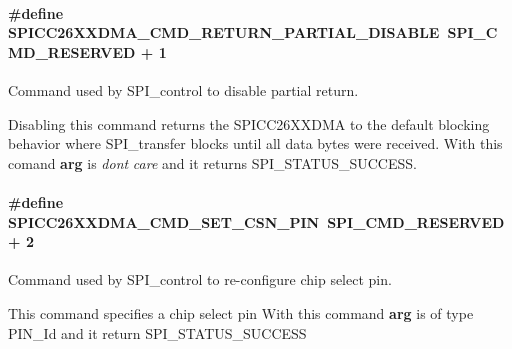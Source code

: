 \paragraph[{S\+P\+I\+C\+C26\+X\+X\+D\+M\+A\+\_\+\+C\+M\+D\+\_\+\+R\+E\+T\+U\+R\+N\+\_\+\+P\+A\+R\+T\+I\+A\+L\+\_\+\+D\+I\+S\+A\+B\+L\+E}]{\setlength{\rightskip}{0pt plus 5cm}\#define S\+P\+I\+C\+C26\+X\+X\+D\+M\+A\+\_\+\+C\+M\+D\+\_\+\+R\+E\+T\+U\+R\+N\+\_\+\+P\+A\+R\+T\+I\+A\+L\+\_\+\+D\+I\+S\+A\+B\+L\+E~{\bf S\+P\+I\+\_\+\+C\+M\+D\+\_\+\+R\+E\+S\+E\+R\+V\+E\+D} + 1}\label{group___s_p_i___c_m_d_gaff8de4036abcdb2903cb5280120c30b4}


Command used by S\+P\+I\+\_\+control to disable partial return. 

Disabling this command returns the S\+P\+I\+C\+C26\+X\+X\+D\+M\+A to the default blocking behavior where S\+P\+I\+\_\+transfer blocks until all data bytes were received. With this comand {\bfseries arg} is {\itshape don\textquotesingle{}t} {\itshape care} and it returns S\+P\+I\+\_\+\+S\+T\+A\+T\+U\+S\+\_\+\+S\+U\+C\+C\+E\+S\+S. 
\paragraph[{S\+P\+I\+C\+C26\+X\+X\+D\+M\+A\+\_\+\+C\+M\+D\+\_\+\+S\+E\+T\+\_\+\+C\+S\+N\+\_\+\+P\+I\+N}]{\setlength{\rightskip}{0pt plus 5cm}\#define S\+P\+I\+C\+C26\+X\+X\+D\+M\+A\+\_\+\+C\+M\+D\+\_\+\+S\+E\+T\+\_\+\+C\+S\+N\+\_\+\+P\+I\+N~{\bf S\+P\+I\+\_\+\+C\+M\+D\+\_\+\+R\+E\+S\+E\+R\+V\+E\+D} + 2}\label{group___s_p_i___c_m_d_gab3ab03abd9ca073344acdcc6b442f9eb}


Command used by S\+P\+I\+\_\+control to re-\/configure chip select pin. 

This command specifies a chip select pin With this command {\bfseries arg} is of type {\ttfamily P\+I\+N\+\_\+\+Id} and it return S\+P\+I\+\_\+\+S\+T\+A\+T\+U\+S\+\_\+\+S\+U\+C\+C\+E\+S\+S 
